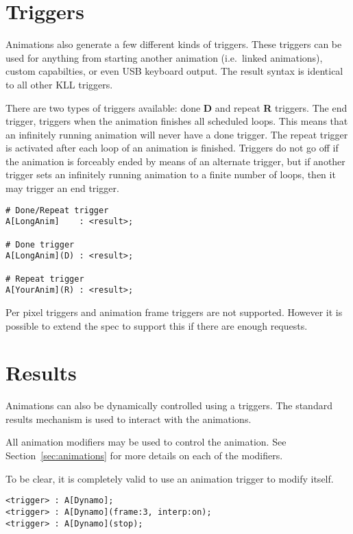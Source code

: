 \documentclass{kiibohd-template}
\begin{document}
\section{Triggers}
\label{sec:Animation_Triggers}

Animations also generate a few different kinds of triggers.
These triggers can be used for anything from starting another animation (i.e.\ linked animations), custom capabilties, or even USB keyboard output.
The result syntax is identical to all other KLL triggers.

There are two types of triggers available: done \textbf{D} and repeat \textbf{R} triggers.
The end trigger, triggers when the animation finishes all scheduled loops.
This means that an infinitely running animation will never have a done trigger.
The repeat trigger is activated after each loop of an animation is finished.
Triggers do not go off if the animation is forceably ended by means of an alternate trigger, but if another trigger sets an infinitely running animation to a finite number of loops, then it may trigger an end trigger.

\begin{lstlisting}
# Done/Repeat trigger
A[LongAnim]    : <result>;

# Done trigger
A[LongAnim](D) : <result>;

# Repeat trigger
A[YourAnim](R) : <result>;
\end{lstlisting}

Per pixel triggers and animation frame triggers are not supported.
However it is possible to extend the spec to support this if there are enough requests.


\section{Results}

Animations can also be dynamically controlled using a triggers.
The standard results mechanism is used to interact with the animations.

All animation modifiers may be used to control the animation.
See Section~\ref{sec:animations} for more details on each of the modifiers.

To be clear, it is completely valid to use an animation trigger to modify itself.

\begin{lstlisting}
<trigger> : A[Dynamo];
<trigger> : A[Dynamo](frame:3, interp:on);
<trigger> : A[Dynamo](stop);
\end{lstlisting}
\end{document}

